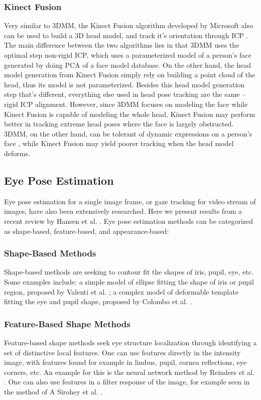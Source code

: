 \subsubsection{Kinect Fusion}
Very similar to 3DMM, the Kinect Fusion algorithm developed by Microsoft also can be used to build a 3D head model, and track it's orientation through ICP \cite{newcombe2011kinectfusion}.  The main difference between the two algorithms lies in that 3DMM uses the optimal step non-rigid ICP, which uses a parameterized model of a person's face generated by doing PCA of a face model database.  On the other hand, the head model generation from Kinect Fusion simply rely on building a point cloud of the head, thus its model is not parameterized.  Besides this head model generation step that's different, everything else used in head pose tracking are the same -- rigid ICP alignment.  However, since 3DMM focuses on modeling the face while Kinect Fusion is capable of modeling the whole head, Kinect Fusion may perform better in tracking extreme head poses where the face is largely obstructed.  3DMM, on the other hand, can be tolerant of dynamic expressions on a person's face \cite{amberg2008expression}, while Kinect Fusion may yield poorer tracking when the head model deforms.

\subsection{Eye Pose Estimation}
Eye pose estimation for a single image frame, or gaze tracking for video stream of images, have also been extensively researched.  Here we present results from a recent review by Hansen et al. \cite{hansen2010eye}.  Eye pose estimation methods can be categorized as shape-based, feature-based, and appearance-based:


\subsubsection{Shape-Based Methods}
Shape-based methods are seeking to contour fit the shapes of iris, pupil, eye, etc.  Some examples include: a simple model of ellipse fitting the shape of iris or pupil region, proposed by Valenti et al. \cite{valenti2008accurate}; a complex model of deformable template fitting the eye and pupil shape, proposed by Colombo et al. \cite{colombo1999real}.


\subsubsection{Feature-Based Shape Methods}
Feature-based shape methods seek eye structure localization through identifying a set of distinctive local features.  One can use features directly in the intensity image, with features found for example in limbus, pupil, cornea reflections, eye corners, etc.  An example for this is the neural network method by Reinders et al. \cite{reinders1996locating}.  One can also use features in a filter response of the image, for example seen in the method of A Sirohey et al. \cite{sirohey2001eye}.


